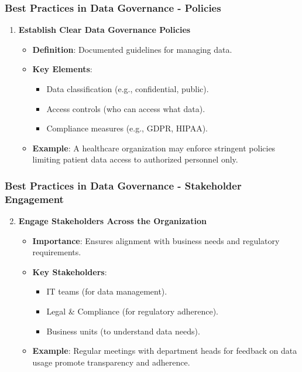 \documentclass{beamer}
\begin{document}
\begin{frame}[fragile]
    \frametitle{Best Practices in Data Governance - Policies}
    \begin{enumerate}
        \item \textbf{Establish Clear Data Governance Policies}
        \begin{itemize}
            \item \textbf{Definition}: Documented guidelines for managing data.
            \item \textbf{Key Elements}:
                \begin{itemize}
                    \item Data classification (e.g., confidential, public).
                    \item Access controls (who can access what data).
                    \item Compliance measures (e.g., GDPR, HIPAA).
                \end{itemize}
            \item \textbf{Example}: A healthcare organization may enforce stringent policies limiting patient data access to authorized personnel only.
        \end{itemize}
    \end{enumerate}
\end{frame}

\begin{frame}[fragile]
    \frametitle{Best Practices in Data Governance - Stakeholder Engagement}
    \begin{enumerate}
        \setcounter{enumi}{1}
        \item \textbf{Engage Stakeholders Across the Organization}
        \begin{itemize}
            \item \textbf{Importance}: Ensures alignment with business needs and regulatory requirements.
            \item \textbf{Key Stakeholders}:
                \begin{itemize}
                    \item IT teams (for data management).
                    \item Legal \& Compliance (for regulatory adherence).
                    \item Business units (to understand data needs).
                \end{itemize}
            \item \textbf{Example}: Regular meetings with department heads for feedback on data usage promote transparency and adherence.
        \end{itemize}
    \end{enumerate}
\end{frame}
\end{document}
